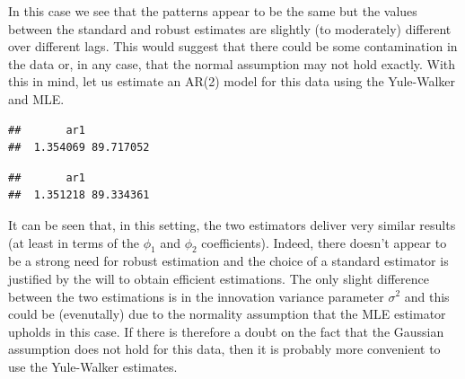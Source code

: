 \documentclass[]{book}
\newenvironment{Shaded}{\begin{snugshade}}{\end{snugshade}}
\newcommand{\CommentTok}[1]{\textcolor[rgb]{0.56,0.35,0.01}{\textit{#1}}}
\newcommand{\DataTypeTok}[1]{\textcolor[rgb]{0.13,0.29,0.53}{#1}}
\newcommand{\DecValTok}[1]{\textcolor[rgb]{0.00,0.00,0.81}{#1}}
\newcommand{\KeywordTok}[1]{\textcolor[rgb]{0.13,0.29,0.53}{\textbf{#1}}}
\newcommand{\NormalTok}[1]{#1}
\newcommand{\OperatorTok}[1]{\textcolor[rgb]{0.81,0.36,0.00}{\textbf{#1}}}
\newcommand{\OtherTok}[1]{\textcolor[rgb]{0.56,0.35,0.01}{#1}}
\newcommand{\StringTok}[1]{\textcolor[rgb]{0.31,0.60,0.02}{#1}}
\theoremstyle{definition}
\theoremstyle{definition}
\theoremstyle{definition}
\theoremstyle{remark}
\begin{document}
In this case we see that the patterns appear to be the same but the
values between the standard and robust estimates are slightly (to
moderately) different over different lags. This would suggest that there
could be some contamination in the data or, in any case, that the normal
assumption may not hold exactly. With this in mind, let us estimate an
AR(2) model for this data using the Yule-Walker and MLE.

\begin{Shaded}
\end{Shaded}

\begin{verbatim}
##       ar1           
##  1.354069 89.717052
\end{verbatim}

\begin{Shaded}
\end{Shaded}

\begin{verbatim}
##       ar1           
##  1.351218 89.334361
\end{verbatim}

It can be seen that, in this setting, the two estimators deliver very
similar results (at least in terms of the \(\phi_1\) and \(\phi_2\)
coefficients). Indeed, there doesn't appear to be a strong need for
robust estimation and the choice of a standard estimator is justified by
the will to obtain efficient estimations. The only slight difference
between the two estimations is in the innovation variance parameter
\(\sigma^2\) and this could be (evenutally) due to the normality
assumption that the MLE estimator upholds in this case. If there is
therefore a doubt on the fact that the Gaussian assumption does not hold
for this data, then it is probably more convenient to use the
Yule-Walker estimates.
\end{document}
